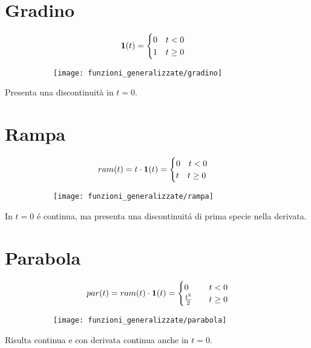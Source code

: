 \documentclass[../main.tex]{subfiles}
\begin{document}
	\section{Gradino}
		\begin{figure}[h!]
			\centering
			\begin{subfigure}{0.4\textwidth}
				\[
					\textbf{1}(t) = 
					\begin{cases}
						0 \quad t<0\\
						1 \quad t \geq 0
					\end{cases}
				\]
			\end{subfigure}
			\begin{subfigure}{0.4\textwidth}
				\texttt{[image: funzioni\_generalizzate/gradino]}
			\end{subfigure}
		\end{figure}
		Presenta una discontinuità in $t=0$.
		
	\section{Rampa}
		\begin{figure}[h!]
			\centering
			\begin{subfigure}{0.4\textwidth}
				\[
					ram(t)= t \cdot \textbf{1}(t) =
					\begin{cases}
						0 \quad t<0\\
						t \quad t \geq 0			
					\end{cases}
				\]
			\end{subfigure}
			\begin{subfigure}{0.4\textwidth}
				\texttt{[image: funzioni\_generalizzate/rampa]}
			\end{subfigure}
		\end{figure}
		In $t=0$ \'e continua, ma presenta una discontinuit\'a di prima specie nella derivata.
		
	\section{Parabola}
		\begin{figure}[h!]
			\centering
			\begin{subfigure}{0.4\textwidth}
				\[
					par(t)= ram(t) \cdot \textbf{1}(t) = 
					\begin{cases}
						0 \quad &t<0\\
						\frac{t^2}{2} \quad &t\geq 0
					\end{cases}
				\]
			\end{subfigure}
			\begin{subfigure}{0.4\textwidth}
				\texttt{[image: funzioni\_generalizzate/parabola]}
			\end{subfigure}
		\end{figure}
		Risulta continua e con derivata continua anche in $t=0$.	
		
\end{document}

